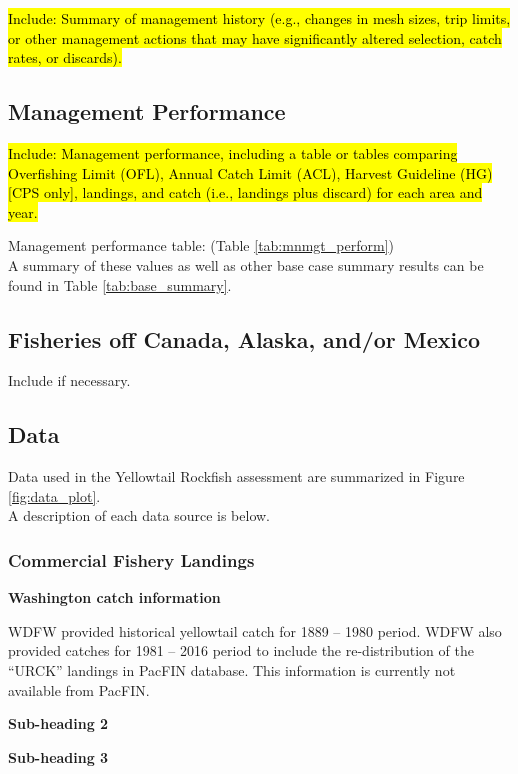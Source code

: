\documentclass[12pt,]{article}
\begin{document}
\hl{Include: Summary of management history (e.g., changes in mesh sizes, trip 
limits, or other management actions that may have significantly altered selection, 
catch rates, or discards).}

\subsection{Management Performance}\label{management-performance-1}

\hl{Include: Management performance, including a table or tables comparing 
Overfishing Limit (OFL), Annual Catch Limit (ACL), Harvest Guideline (HG) 
[CPS only], landings, and catch (i.e., landings plus discard) for each area and year.}

Management performance table: (Table \ref{tab:mnmgt_perform})\\
A summary of these values as well as other base case summary results can
be found in Table \ref{tab:base_summary}.

\subsection{Fisheries off Canada, Alaska, and/or
Mexico}\label{fisheries-off-canada-alaska-andor-mexico}

Include if necessary.

\subsection{Data}\label{data}

Data used in the Yellowtail Rockfish assessment are summarized in Figure
\ref{fig:data_plot}.\\
A description of each data source is below.

\subsubsection{Commercial Fishery
Landings}\label{commercial-fishery-landings}

\textbf{Washington catch information}

WDFW provided historical yellowtail catch for 1889 -- 1980 period. WDFW
also provided catches for 1981 -- 2016 period to include the
re-distribution of the ``URCK'' landings in PacFIN database. This
information is currently not available from PacFIN.

\textbf{Sub-heading 2}

\textbf{Sub-heading 3}
\end{document}
